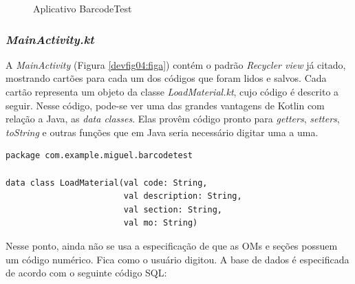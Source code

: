 \begin{figure}[ht!]
{        \label{devfig04:figc}
    }
    \quad
    \caption{Aplicativo BarcodeTest}
    \label{devfig04}
\end{figure}

\subsubsection*{\textit{MainActivity.kt}}

A \textit{MainActivity} (Figura \ref{devfig04:figa}) contém o padrão \textit{Recycler view} já citado, mostrando cartões para cada um dos códigos que foram lidos e salvos. Cada cartão representa um objeto da classe \textit{LoadMaterial.kt}, cujo código é descrito a seguir. Nesse código, pode-se ver uma das grandes vantagens de Kotlin com relação a Java, as \textit{data classes}. Elas provêm código pronto para \textit{getters}, \textit{setters}, \textit{toString} e outras funções que em Java seria necessário digitar uma a uma.

\begin{verbatim}
package com.example.miguel.barcodetest

data class LoadMaterial(val code: String,
                        val description: String,
                        val section: String,
                        val mo: String)
\end{verbatim}

Nesse ponto, ainda não se usa a especificação de que as OMs e seções possuem um código numérico. Fica como o usuário digitou. A base de dados é especificada de acordo com o seguinte código SQL:

